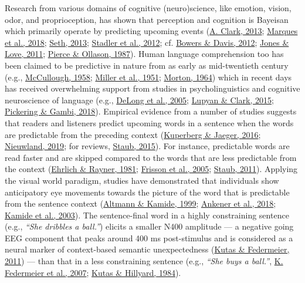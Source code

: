 \documentclass[a4paper, nobind]{templates/ociamthesis}
\begin{document}
Research from various domains of cognitive (neuro)science, like emotion, vision, odor, and proprioception, has shown that perception and cognition is Bayeisan which primarily operate by predicting upcoming events (\protect\hyperlink{ref-Clark2013}{A. Clark, 2013}; \protect\hyperlink{ref-Marques2018}{Marques et al., 2018}; \protect\hyperlink{ref-Seth2013}{Seth, 2013}; \protect\hyperlink{ref-Stadler2012}{Stadler et al., 2012}; cf. \protect\hyperlink{ref-Bowers2012}{Bowers \& Davis, 2012}; \protect\hyperlink{ref-Jones2011}{Jones \& Love, 2011}; \protect\hyperlink{ref-Pierce1987}{Pierce \& Ollason, 1987}).
Human language comprehension too has been claimed to be predictive in nature from as early as mid-twentieth century (e.g., \protect\hyperlink{ref-Mccullough1958}{McCullough, 1958}; \protect\hyperlink{ref-Miller1951}{Miller et al., 1951}; \protect\hyperlink{ref-Morton1964}{Morton, 1964})
which in recent days has received overwhelming support from studies in psycholinguistics and cognitive neuroscience of language (e.g., \protect\hyperlink{ref-Delong2005}{DeLong et al., 2005}; \protect\hyperlink{ref-Lupyan2015}{Lupyan \& Clark, 2015}; \protect\hyperlink{ref-Pickering2018}{Pickering \& Gambi, 2018}).
Empirical evidence from a number of studies suggests that readers and listeners predict upcoming words in a sentence when the words are predictable from the preceding context (\protect\hyperlink{ref-Kuperberg2016}{Kuperberg \& Jaeger, 2016}; \protect\hyperlink{ref-Nieuwland2019}{Nieuwland, 2019}; for reviews, \protect\hyperlink{ref-Staub2015}{Staub, 2015}).
For instance, predictable words are read faster and are skipped compared to the words that are less predictable from the context (\protect\hyperlink{ref-Ehrlich1981}{Ehrlich \& Rayner, 1981}; \protect\hyperlink{ref-Frisson2005}{Frisson et al., 2005}; \protect\hyperlink{ref-Staub2011}{Staub, 2011}).
Applying the visual world paradigm, studies have demonstrated that individuals show anticipatory eye movements towards the picture of the word that is predictable from the sentence context (\protect\hyperlink{ref-Altmann1999}{Altmann \& Kamide, 1999}; \protect\hyperlink{ref-Ankener2018}{Ankener et al., 2018}; \protect\hyperlink{ref-Kamide2003}{Kamide et al., 2003}).
The sentence-final word in a highly constraining sentence (e.g., \emph{``She dribbles a ball.''}) elicits a smaller N400 amplitude --- a negative going EEG component that peaks around 400 ms post-stimulus and is considered as a neural marker of context-based semantic unexpectedness (\protect\hyperlink{ref-Kutas2011}{Kutas \& Federmeier, 2011}) --- than that in a less constraining sentence (e.g., \emph{``She buys a ball.''}, \protect\hyperlink{ref-Federmeier2007}{K. Federmeier et al., 2007}; \protect\hyperlink{ref-Kutas1984}{Kutas \& Hillyard, 1984}).
\end{document}

